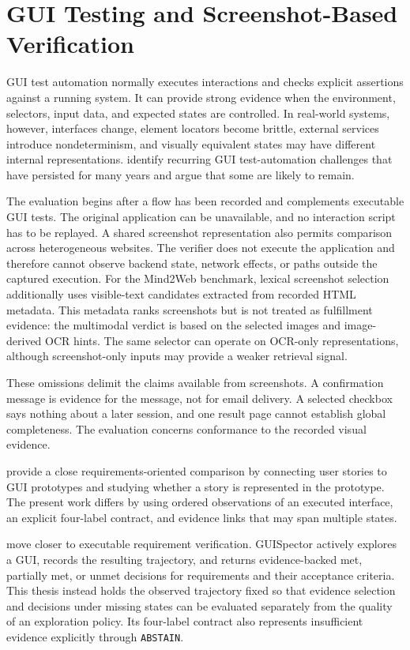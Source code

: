 \section{GUI Testing and Screenshot-Based Verification}\label{gui-testing-and-screenshot-based-verification}

GUI test automation normally executes interactions and checks explicit
assertions against a running system. It can provide strong evidence when the
environment, selectors, input data, and expected states are controlled. In
real-world systems, however, interfaces change, element locators become brittle,
external services introduce nondeterminism, and visually equivalent states may
have different internal representations. \textcite{nass2021}
identify recurring GUI test-automation challenges that have persisted for many
years and argue that some are likely to remain.

The evaluation begins after a flow has been recorded and complements executable
GUI tests. The original application can be unavailable, and no interaction
script has to be replayed. A shared screenshot representation also permits
comparison across heterogeneous websites. The verifier does not execute the
application and therefore cannot observe backend state, network effects, or
paths outside the captured execution. For the Mind2Web benchmark, lexical
screenshot selection additionally uses visible-text candidates extracted from
recorded HTML metadata. This metadata ranks screenshots but is not treated as
fulfillment evidence: the multimodal verdict is based on the selected images
and image-derived OCR hints. The same selector can operate on OCR-only
representations, although screenshot-only inputs may provide a weaker retrieval
signal.

These omissions delimit the claims available from screenshots. A confirmation
message is evidence for the message, not for email delivery. A selected
checkbox says nothing about a later session, and one result page cannot
establish global completeness. The evaluation concerns conformance to the
recorded visual evidence.

\textcite{kretzer2025} provide a close requirements-oriented comparison by
connecting user stories to GUI prototypes and studying whether a story is
represented in the prototype. The present work differs by using ordered
observations of an executed interface, an explicit four-label contract, and
evidence links that may span multiple states.

\textcite{kolthoff2025guispector} move closer to executable requirement verification.
GUISpector actively explores a GUI, records the resulting trajectory, and
returns evidence-backed met, partially met, or unmet decisions for requirements
and their acceptance criteria. This thesis instead holds the observed
trajectory fixed so that evidence selection and decisions under missing states
can be evaluated separately from the quality of an exploration policy. Its
four-label contract also represents insufficient evidence explicitly through
\texttt{ABSTAIN}.

